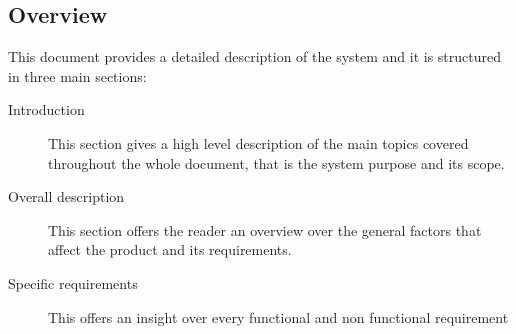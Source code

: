 \documentclass[12pt, a4paper]{article}
\begin{document}

\subsection{Overview}
This document provides a detailed description of the system and it is structured in three main sections:

\begin{description}
  \item[Introduction] This section gives a high level description of the main topics covered throughout the whole document, that is the system purpose and its scope.
  \item[Overall description] This section offers the reader an overview over the general factors that affect the product and its requirements.
  \item[Specific requirements] This offers an insight over every functional and non functional requirement
\end{description}
\end{document}
